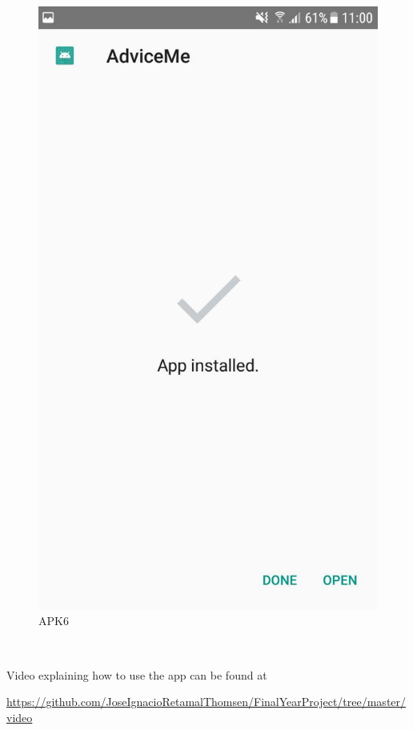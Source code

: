\begin{figure}[h!]
\begin{minipage}[t]{0.48\textwidth}
\includegraphics[width=\linewidth,keepaspectratio=true]{img/apk6.jpg}
\caption{APK6}
\label{fig:APK6}
\end{minipage}
\end{figure}

\

Video explaining how to use the app can be found at

\url{https://github.com/JoseIgnacioRetamalThomsen/FinalYearProject/tree/master/video}

